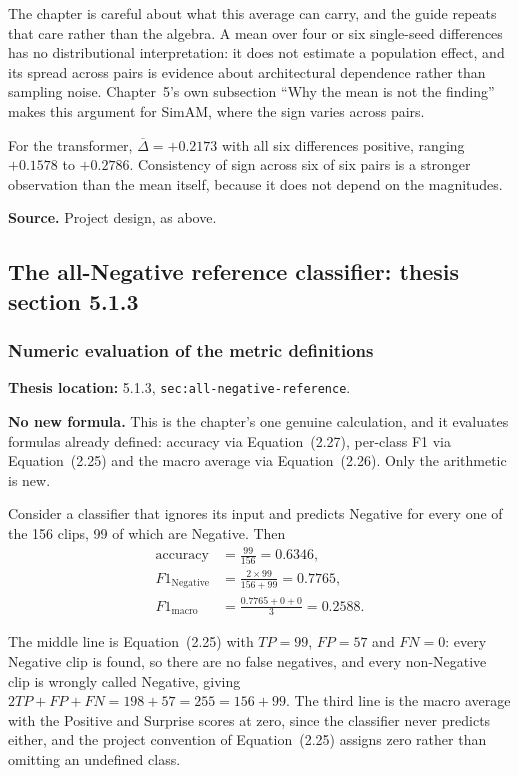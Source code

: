 \documentclass[11pt,a4paper]{article}
\numberwithin{equation}{section}
\begin{document}
The chapter is careful about what this average can carry, and the guide
repeats that care rather than the algebra. A mean over four or six
single-seed differences has no distributional interpretation: it does not
estimate a population effect, and its spread across pairs is evidence about
architectural dependence rather than sampling noise. Chapter~5's own
subsection ``Why the mean is not the finding'' makes this argument for SimAM,
where the sign varies across pairs.

For the transformer, $\overline{\Delta} = +0.2173$ with all six differences
positive, ranging $+0.1578$ to $+0.2786$. Consistency of sign across six of
six pairs is a stronger observation than the mean itself, because it does not
depend on the magnitudes.

\textbf{Source.} Project design, as above.

\subsection{The all-Negative reference classifier: thesis section 5.1.3}

\subsubsection{Numeric evaluation of the metric definitions}
\label{fg5:all-negative}
\textbf{Thesis location:} 5.1.3, \texttt{sec:all-negative-reference}.

\textbf{No new formula.} This is the chapter's one genuine calculation, and it
evaluates formulas already defined: accuracy via
Equation~(2.27), per-class F1 via Equation~(2.25) and the macro average via
Equation~(2.26). Only the arithmetic is new.

Consider a classifier that ignores its input and predicts Negative for every
one of the 156 clips, 99 of which are Negative. Then
\begin{equation}
\begin{aligned}
    \text{accuracy} &= \frac{99}{156} = 0.6346,\\
    F1_{\mathrm{Negative}} &= \frac{2\times 99}{156+99} = 0.7765,\\
    F1_{\mathrm{macro}} &= \frac{0.7765+0+0}{3} = 0.2588.
    \end{aligned}
    \label{fg5:eq:all-negative}
\end{equation}

The middle line is Equation~(2.25) with $TP = 99$, $FP = 57$ and $FN = 0$:
every Negative clip is found, so there are no false negatives, and every
non-Negative clip is wrongly called Negative, giving
$2TP + FP + FN = 198 + 57 = 255 = 156 + 99$. The third line is the macro
average with the Positive and Surprise scores at zero, since the classifier
never predicts either, and the project convention of Equation~(2.25) assigns
zero rather than omitting an undefined class.
\end{document}
